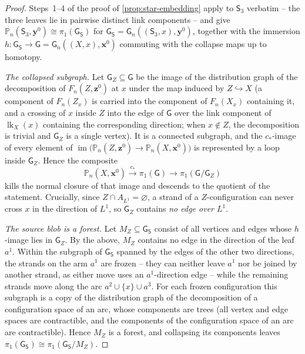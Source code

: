 \documentclass[reqno]{amsart}
\theoremstyle{definition}
\newcommand\bfx{\mathbf{x}}
\newcommand\bfy{\mathbf{y}}
\newcommand\bfz{\mathbf{z}}
\newcommand\sfG{\mathsf{G}}
\newcommand\sfS{\mathsf{S}}
\newcommand{\PB}{\mathbb{P}}
\newcommand{\im}{\operatorname{im}}
\newcommand{\base}{\bfx^0}
\DeclareMathOperator{\lk}{lk}
\numberwithin{equation}{section}
\begin{document}
\begin{proof}
Steps~1--4 of the proof of \cref{prop:star-embedding} apply to
\(\sfS_3\) verbatim -- the three leaves lie in pairwise distinct
link components -- and give
\(\PB_n(\sfS_3,\bfy^0)\cong\pi_1(\sfG_\sfS)\) for
\(\sfG_\sfS=\sfG_n((\sfS_3,x),\bfy^0)\), together with the immersion
\(h\colon\sfG_\sfS\to\sfG=\sfG_n((X,x),\base)\) commuting with the
collapse maps up to homotopy.

\smallskip
\noindent\emph{The collapsed subgraph.}
Let \(\sfG_Z\subseteq\sfG\) be the image of the distribution graph
of the decomposition of \(F_n(Z,\bfz^0)\) at \(x\) under the map
induced by \(Z\hookrightarrow X\) (a component of \(F_n(Z_x)\) is
carried into the component of \(F_n(X_x)\) containing it, and a
crossing of \(x\) inside \(Z\) into the edge of \(\sfG\) over the
link component of \(\lk_X(x)\) containing the corresponding
direction; when \(x\notin Z\), the decomposition is trivial and
\(\sfG_Z\) is a single vertex). It is a connected subgraph, and
the \(c_\ast\)-image of every element of
\(\im\bigl(\PB_n(Z,\bfz^0)\to\PB_n(X,\base)\bigr)\) is represented
by a loop inside \(\sfG_Z\). Hence the composite
\[
\PB_n(X,\base)\xrightarrow{c_\ast}\pi_1(\sfG)
\longrightarrow\pi_1(\sfG/\sfG_Z)
\]
kills the normal closure of that image and descends to the
quotient of the statement. Crucially, since
\(Z\cap A_{L^1}=\varnothing\), a strand of a \(Z\)-configuration
can never cross \(x\) in the direction of \(L^1\), so \(\sfG_Z\)
contains \emph{no edge over \(L^1\)}.

\smallskip
\noindent\emph{The source blob is a forest.}
Let \(M_Z\subseteq\sfG_\sfS\) consist of all vertices and edges whose
\(h\)-image lies in \(\sfG_Z\). By the above, \(M_Z\) contains no
edge in the direction of the leaf \(a^1\). Within the subgraph of
\(\sfG_\sfS\) spanned by the edges of the other two directions, the
strands on the arm \(a^1\) are frozen -- they can neither leave
\(a^1\) nor be joined by another strand, as either move uses an
\(a^1\)-direction edge -- while the remaining strands move along
the arc \(a^2\cup\{x\}\cup a^3\). For each frozen configuration
this subgraph is a copy of the distribution graph of the
decomposition of a configuration space of an arc, whose components
are trees (all vertex and edge spaces are contractible, and the
components of the configuration space of an arc are contractible).
Hence \(M_Z\) is a forest, and collapsing its components leaves
\(\pi_1(\sfG_\sfS)\cong\pi_1(\sfG_\sfS/M_Z)\).


\end{proof}
\end{document}
